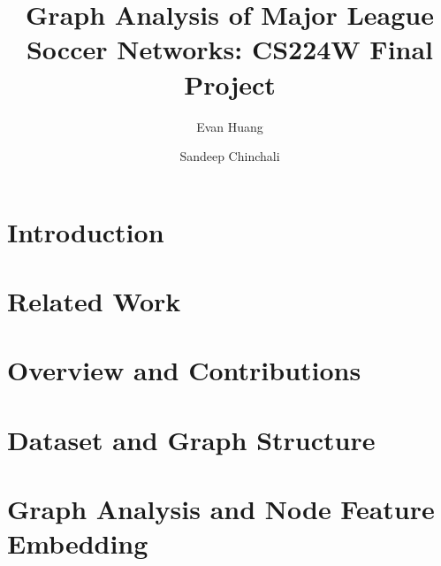 \documentclass[twoside,twocolumn,12pt]{article}
\begin{document}

\title{Graph Analysis of Major League Soccer Networks: CS224W Final Project}
%

\author[1]{Evan Huang}
\author[2]{Sandeep Chinchali}


%
\maketitle

\section{Introduction}
\label{sec:introduction}


\section{Related Work}
\label{sec:related_work}



\section{Overview and Contributions}
\label{sec:outline}


\section{Dataset and Graph Structure}
\label{sec:dataset}


\section{Graph Analysis and Node Feature Embedding}
\label{sec:graph_analysis}

\end{document}
